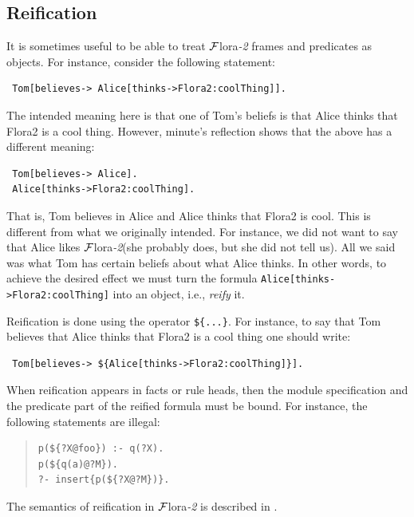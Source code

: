 \documentclass[11pt]{article}
\newcommand{\FLORA}{{\mbox{\sc ${\cal F}${lora}\rm\emph{-2}}}\xspace}
\newcommand{\FLSYSTEM}{\FLORA}
\begin{document}
\subsection{Reification}
\label{sec-reification}

It is sometimes useful to be able to treat \FLSYSTEM frames and predicates
as objects. For instance, consider the following statement:
\begin{verbatim}
 Tom[believes-> Alice[thinks->Flora2:coolThing]].
\end{verbatim}
The intended meaning here is that one of Tom's beliefs is that Alice
thinks that Flora2 is a cool thing. However, minute's reflection shows
that the above has a different meaning:
\begin{verbatim}
 Tom[believes-> Alice].
 Alice[thinks->Flora2:coolThing].  
\end{verbatim}
That is, Tom believes in Alice and Alice thinks that Flora2 is
cool. This is different from what we originally intended. For instance, we
did not want to say that Alice likes \FLSYSTEM (she probably does, but she did
not tell us). All we said was what Tom has certain beliefs about what Alice
thinks. In other words, to achieve the desired effect we must turn the
formula {\tt Alice[thinks->Flora2:coolThing]} into an object,
i.e., \emph{reify} it.

Reification is done using the operator {\tt \$\{...\}}. For instance, to
say that Tom believes that Alice thinks that Flora2 is a
cool thing one should write:
\begin{verbatim}
 Tom[believes-> ${Alice[thinks->Flora2:coolThing]}].
\end{verbatim}

When reification appears in facts or rule heads, then the module
specification and the predicate part of the reified formula must be bound.
For instance, the following statements are illegal:
\begin{quote}
\begin{verbatim}
p(${?X@foo}) :- q(?X).
p(${q(a)@?M}).
?- insert{p(${?X@?M})}. 
\end{verbatim}
\end{quote}

\noindent
The semantics of reification in \FLSYSTEM is described in
\cite{reification-data-semantics-03}.
\end{document}
